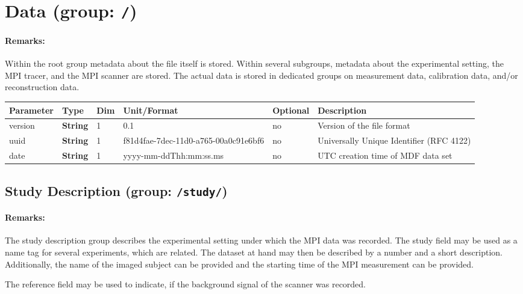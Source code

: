 \documentclass[landscape]{article} %
\newcommand{\inl}[1]{\lstinline[columns=fixed]{#1}}
\newcommand{\inltab}[1]{{\ttfamily\bfseries\color{blue}#1}}
\newcommand{\inlvar}[1]{{\ttfamily#1}}
\begin{document}
\newpage

\section{Data (group: \inl{/})}
 \setlength\extrarowheight{5pt}

\begin{multicols}{2}

\paragraph{Remarks:} Within the root group metadata about the file itself is stored. Within several subgroups, metadata about the experimental setting, the MPI tracer, and the MPI scanner are stored. The actual data is stored in dedicated groups on measurement data, calibration data, and/or reconstruction data.

\end{multicols}


\noindent \begin{tabularx}{\columnwidth}{lllllX} 
\textbf{Parameter} & \textbf{Type} & \textbf{Dim} & \textbf{Unit/Format} & \textbf{Optional} & \textbf{Description} \\ \hline 
\inlvar{version} & \inltab{String} & 1 & 0.1 & no & Version of the file format \\ \hline
\inlvar{uuid} & \inltab{String} & 1 & f81d4fae-7dec-11d0-a765-00a0c91e6bf6 & no & Universally Unique Identifier (RFC 4122) \\ \hline 
\inlvar{date} & \inltab{String} & 1 & yyyy-mm-ddThh:mm:ss.ms & no & UTC creation time of MDF data set \\ \hline
\end{tabularx}


\subsection{Study Description (group: \inl{/study/})}

\begin{multicols}{2}

\paragraph{Remarks:} The study description group describes the experimental setting under which the MPI data was recorded. The study field may be used as a name tag for several experiments, which are related. The dataset at hand may then be described by a number and a short description. Additionally, the name of the imaged subject can be provided and the starting time of the MPI measurement can be provided.

The reference field may be used to indicate, if the background signal of the scanner was recorded.

\end{multicols}
\end{document}
